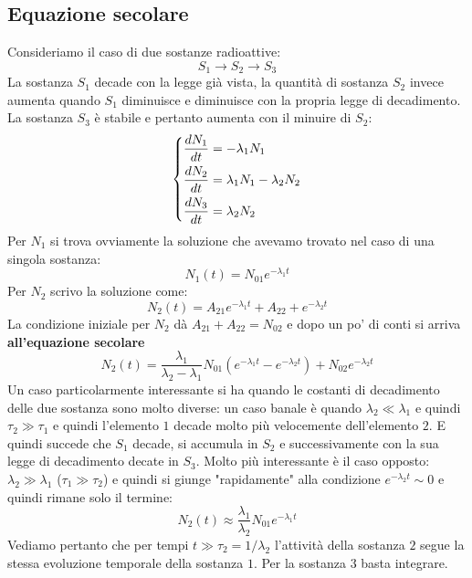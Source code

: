 \subsection{Equazione secolare}
Consideriamo il caso di due sostanze radioattive:
\begin{equation*}
    S_1\to S_2\to S_3
\end{equation*}
La sostanza $S_1$ decade con la legge già vista, la quantità di sostanza $S_2$ invece aumenta quando $S_1$ diminuisce e diminuisce con la propria legge di decadimento. La sostanza $S_3$ è stabile e pertanto aumenta con il minuire di $S_2$:
\begin{equation*}
    \begin{dcases} \dfrac{dN_1}{dt}=-\lambda_1 N_1\\
\dfrac{dN_2}{dt}=\lambda_1N_1-\lambda_2N_2\\
\dfrac{dN_3}{dt}=\lambda_2N_2\\
\end{dcases}
\end{equation*}
Per $N_1$ si trova ovviamente la soluzione che avevamo trovato nel caso di una singola sostanza:
\begin{equation*}
    N_1(t)=N_{01}e^{-\lambda_1t}
\end{equation*}
Per $N_2$ scrivo la soluzione come:
\begin{equation*}
    N_2(t)=A_{21}e^{-\lambda_1t}+A_{22}+e^{-\lambda_2t}
\end{equation*}
La condizione iniziale per $N_2$ dà $A_{21}+A_{22}=N_{02}$ e dopo un po' di conti si arriva \textbf{all'equazione secolare}
\begin{equation*}
    N_2(t)=\frac{\lambda_1}{\lambda_2-\lambda_1}N_{01}(e^{-\lambda_1t}-e^{-\lambda_2t})+N_{02}e^{-\lambda_2t}
\end{equation*}
Un caso particolarmente interessante si ha quando le costanti di decadimento delle due sostanza sono molto diverse: un caso banale è quando $\lambda_2\ll\lambda_1$ e quindi $\tau_2\gg\tau_1$ e quindi l'elemento $1$ decade molto più velocemente dell'elemento $2$. E quindi succede che $S_1$ decade, si accumula in $S_2$ e successivamente con la sua legge di decadimento decate in $S_3$. Molto più interessante è il caso opposto: $\lambda_2\gg\lambda_1$ ($\tau_1\gg\tau_2$) e quindi si giunge "rapidamente" alla condizione $e^{-\lambda_2t}\sim 0$ e quindi rimane solo il termine:
\begin{equation*}
    N_2(t)\approx\frac{\lambda_1}{\lambda_2}N_{01}e^{-\lambda_1t}
\end{equation*}
Vediamo pertanto che per tempi $t\gg\tau_2=1/\lambda_2$ l'attività della sostanza $2$ segue la stessa evoluzione temporale della sostanza $1$. Per la sostanza $3$ basta integrare.
